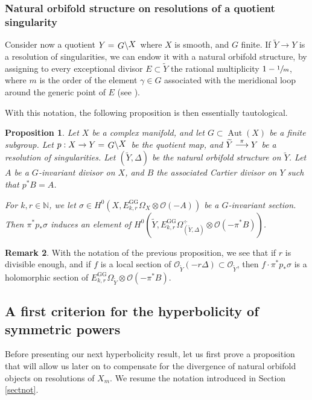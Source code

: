 \documentclass[JEP,XML,SOM,Unicode, NoEqCountersInSection,NoFloatCountersInSection,published]{cedram}
\let\mathcal\mathscr
\def\To#1{\mathchoice{\xrightarrow{\textstyle\kern4pt#1\kern3pt}}{\stackrel{#1}{\longrightarrow}}{}{}}
\newcommand{\rGG}{\mathrm{GG}}
\DeclareMathOperator{\Aut}{Aut}
\theoremstyle{theorem}
\newtheorem{proposition}{Proposition} [section]
\theoremstyle{definition}
\newtheorem{remark}[proposition]{Remark}
\newcommand{\quotient}[2]{{\left.\raisebox{-.08em}{$#1$}\middle\backslash\raisebox{.08em}{$#2$}\right.}}
\begin{document}
\subsubsection{Natural orbifold structure on resolutions of a quotient singularity} Consider now a quotient $Y = \quotient{G}{X}$ where $X$ is smooth, and $G$ finite. If $\widetilde{Y} \to Y$ is a resolution of singularities, we can endow it with a natural orbifold structure, by assigning to every exceptional divisor $E \subset \widetilde{Y}$ the rational multiplicity $1 - \sfrac{1}{m}$, where $m$ is the order of the element $\gamma \in G$ associated with the meridional loop around the generic point of $E$ (see \cite{CDG19, cad18}).

With this notation, the following proposition is then essentially tautological.

\begin{proposition} \label{proporbjet}
Let $X$ be a complex manifold, and let $G \subset \Aut(X)$ be a finite subgroup. Let $p : X \to Y = \quotient{G}{X}$ be the quotient map, and $\widetilde{Y} \To{\pi} Y$ be a resolution of singularities. Let $(\widetilde{Y}, \Delta)$ be the natural orbifold structure on $\widetilde{Y}$. Let $A$ be a $G$-invariant divisor on $X$, and $B$ the associated Cartier divisor on $Y$ such that \(p^{\ast} B = A\).

For $k, r \in \mathbb N$, we let $\sigma \in H^0(X, E_{k,r}^{\rGG} \Omega_X \otimes \mathcal O(-A))$ be a $G$-invariant section. Then $\pi^\ast p_\ast \sigma$ induces an element of $H^0( \widetilde{Y}, E_{k,r}^{\rGG} \Omega_{(\widetilde{Y}, \Delta)}^\div \otimes \mathcal O(- \pi^\ast B))$.
\end{proposition}

\begin{remark}
With the notation of the previous proposition, we see that if $r$ is divisible enough, and if $f$ is a local section of $\mathcal O_{\widetilde{Y}}(-r \Delta) \subset \mathcal O_{\widetilde{Y}}$, then $f \cdot \pi^\ast p_\ast \sigma$ is a holomorphic section of $E_{k, r}^{\rGG} \Omega_{\widetilde{Y}} \otimes \mathcal O(- \pi^\ast B)$.
\end{remark}

\subsection{A first criterion for the hyperbolicity of symmetric powers} \label{sectcrithyp}

Before presenting our next hyperbolicity result, let us first prove a proposition that will allow us later on to compensate for the divergence of natural orbifold objects on resolutions of $X_m$. We resume the notation introduced in Section \ref{sectnot}.
\end{document}
